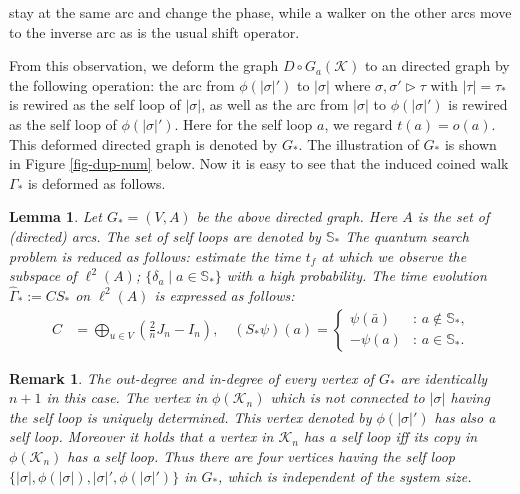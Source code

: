 \documentclass[a4paper,12pt]{article}
\newtheorem{lemma}[definition]{Lemma}
\newtheorem{remark}[definition]{Remark}
\numberwithin{equation}{section}
\begin{document}
stay at the same arc and change the phase, while a walker on the other arcs move to the inverse arc as is the usual shift operator. 
\par
From this observation, we deform the graph $D\circ G_a(\mathcal{K})$ to an directed graph by the following operation: 
the arc from $\phi(|\sigma|')$ to $|\sigma|$ where $\sigma,\sigma'\triangleright \tau$ with $|\tau|=\tau_\ast$ is rewired as the self loop of $|\sigma|$, 
as well as the arc from $|\sigma|$ to $\phi(|\sigma|')$ is rewired as the self loop of $\phi(|\sigma|')$. 
Here for the self loop $a$, we regard $t(a)=o(a)$. 
This deformed directed graph is denoted by $G_\ast$.
The illustration of $G_\ast$ is shown in Figure \ref{fig-dup-num} below.
Now it is easy to see that the induced coined walk $\Gamma_\ast$ is deformed as follows.%
%
\begin{lemma}\label{reducedgraph}
Let $G_\ast =(V,A)$ be the above directed graph. Here $A$ is the set of (directed) arcs. 
The set of self loops are denoted by $\mathbb{S}_\ast$ 
The quantum search problem is reduced as follows: 
estimate the time $t_f$ at which we observe the subspace of $\ell^2(A)$; $\{\delta_a \;|\; a\in \mathbb{S}_\ast\}$ with a high probability.   
The time evolution $\hat{\Gamma}_\ast :=CS_\ast$ on $\ell^2(A)$ is expressed as follows:
\begin{align*}
C &= \bigoplus_{u\in V} \left( \frac{2}{n}J_n- I_n \right),\quad
(S_\ast\psi)(a) = \begin{cases} 
	\psi(\bar{a}) & \text{: $a\notin \mathbb{S}_\ast $,} \\ 
	-\psi(a) & \text{: $a\in \mathbb{S}_\ast $.} 
	\end{cases}
\end{align*}
\end{lemma}
%
%

\begin{remark}
The out-degree and in-degree of every vertex of $G_*$ are identically $n+1$ in this case. 
The vertex in $\phi(\mathcal{K}_n)$ which is not connected to $|\sigma|$ having the self loop is uniquely determined. 
This vertex denoted by $\phi(|\sigma|')$ has also a self loop. Moreover it holds that 
a vertex in $\mathcal{K}_n$ has a self loop iff its copy in $\phi(\mathcal{K}_n)$ has a self loop. 
Thus there are four vertices having the self loop $\{|\sigma|,\phi(|\sigma|),|\sigma|',\phi(|\sigma|') \}$ in $G_*$, which is independent of the system size. 
\end{remark}
\end{document}
